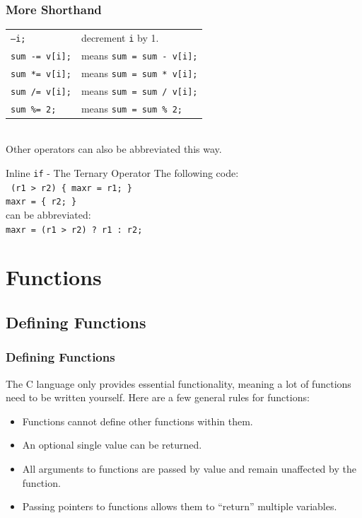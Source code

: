 \documentclass[smaller,handout,table]{beamer}
\begin{document}
\begin{frame}
\frametitle{More Shorthand}
\begin{tabular}{l l}
\tt --i;&decrement {\tt i} by 1.\\
\tt sum -= v[i];&means {\tt sum = sum - v[i];}\\
\tt sum *= v[i];&means {\tt sum = sum * v[i];}\\
\tt sum /= v[i];&means {\tt sum = sum / v[i];}\\
\tt sum \%= 2;&means {\tt sum = sum \% 2;}
\end{tabular}\\
Other operators can also be abbreviated this way.
\begin{exampleblock}{Inline {\tt if} - The Ternary Operator}
The following code:\\
\texttt{ (r1 > r2) \{ maxr = r1; \}\\
 maxr = \{ r2; \} }\\
can be abbreviated:\\
\texttt{maxr = (r1 > r2) ? r1 : r2;}
\end{exampleblock}
\end{frame}



\section{Functions}

\subsection{Defining Functions}
\begin{frame}
\frametitle{Defining Functions}
The C language only provides essential functionality, meaning a lot of functions need to be written yourself. Here are a few general rules for functions:

\begin{itemize}
\item Functions cannot define other functions within them.
\item An optional single value can be returned.
\item All arguments to functions are passed by value and remain unaffected by the function.
\item Passing pointers to functions allows them to ``return'' multiple variables.
\end{itemize}
\end{frame}
\end{document}
